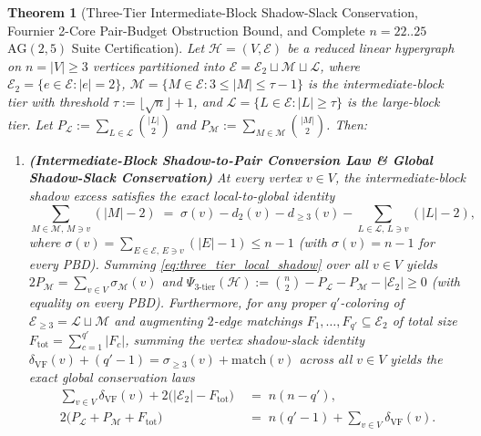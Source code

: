 \documentclass[11pt,reqno]{amsart}
\newtheorem{theorem}{Theorem}[section]
\theoremstyle{definition}
\theoremstyle{remark}
\begin{document}
\begin{theorem}[Three-Tier Intermediate-Block Shadow-Slack Conservation, Fournier 2-Core Pair-Budget Obstruction Bound, and Complete $n = 22..25$ $\mathrm{AG}(2,5)$ Suite Certification]\label{thm:three_tier_discharging_closure}
Let $\mathcal{H} = (V, \mathcal{E})$ be a reduced linear hypergraph on $n = |V| \ge 3$ vertices partitioned into $\mathcal{E} = \mathcal{E}_2 \sqcup \mathcal{M} \sqcup \mathcal{L}$, where $\mathcal{E}_2 = \{e \in \mathcal{E} : |e| = 2\}$, $\mathcal{M} = \{M \in \mathcal{E} : 3 \le |M| \le \tau - 1\}$ is the intermediate-block tier with threshold $\tau := \lfloor\sqrt{n}\rfloor + 1$, and $\mathcal{L} = \{L \in \mathcal{E} : |L| \ge \tau\}$ is the large-block tier. Let $P_{\mathcal{L}} := \sum_{L \in \mathcal{L}}\binom{|L|}{2}$ and $P_{\mathcal{M}} := \sum_{M \in \mathcal{M}}\binom{|M|}{2}$. Then:
\begin{enumerate}
  \item[\textup{(a)}] \textbf{(Intermediate-Block Shadow-to-Pair Conversion Law \& Global Shadow-Slack Conservation)} At every vertex $v \in V$, the intermediate-block shadow excess satisfies the exact local-to-global identity
  \begin{equation}\label{eq:three_tier_local_shadow}
    \sum_{M \in \mathcal{M},\, M \ni v} (|M| - 2) \;=\; \sigma(v) - d_2(v) - d_{\ge 3}(v) - \sum_{L \in \mathcal{L},\, L \ni v} (|L| - 2),
  \end{equation}
  where $\sigma(v) = \sum_{E \in \mathcal{E},\, E \ni v}(|E| - 1) \le n - 1$ (with $\sigma(v) = n - 1$ for every PBD). Summing \eqref{eq:three_tier_local_shadow} over all $v \in V$ yields $2 P_{\mathcal{M}} = \sum_{v \in V}\sigma_{\mathcal{M}}(v)$ and $\Psi_{3\text{-tier}}(\mathcal{H}) := \binom{n}{2} - P_{\mathcal{L}} - P_{\mathcal{M}} - |\mathcal{E}_2| \ge 0$ (with equality on every PBD). Furthermore, for any proper $q'$-coloring of $\mathcal{E}_{\ge 3} = \mathcal{L} \sqcup \mathcal{M}$ and augmenting $2$-edge matchings $F_1, \dots, F_{q'} \subseteq \mathcal{E}_2$ of total size $F_{\mathrm{tot}} = \sum_{c=1}^{q'} |F_c|$, summing the vertex shadow-slack identity $\delta_{\mathrm{VF}}(v) + (q' - 1) = \sigma_{\ge 3}(v) + \mathrm{match}(v)$ across all $v \in V$ yields the exact global conservation laws
  \begin{equation}\label{eq:psi_three_tier}
    \begin{aligned}
      \sum_{v \in V} \delta_{\mathrm{VF}}(v) + 2\bigl(|\mathcal{E}_2| - F_{\mathrm{tot}}\bigr) &\;=\; n(n - q'), \\
      2\bigl(P_{\mathcal{L}} + P_{\mathcal{M}} + F_{\mathrm{tot}}\bigr) &\;=\; n(q' - 1) + \sum_{v \in V} \delta_{\mathrm{VF}}(v).

\end{aligned}
\end{equation}
\end{enumerate}
\end{theorem}
\end{document}

